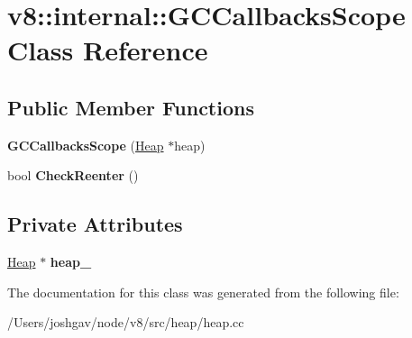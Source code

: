 \hypertarget{classv8_1_1internal_1_1_g_c_callbacks_scope}{}\section{v8\+:\+:internal\+:\+:G\+C\+Callbacks\+Scope Class Reference}
\label{classv8_1_1internal_1_1_g_c_callbacks_scope}
\subsection*{Public Member Functions}
\begin{DoxyCompactItemize}
\item 
{\bfseries G\+C\+Callbacks\+Scope} (\hyperlink{classv8_1_1internal_1_1_heap}{Heap} $\ast$heap)\hypertarget{classv8_1_1internal_1_1_g_c_callbacks_scope_a4e1f52e32b1e4858d57300a08d121068}{}\label{classv8_1_1internal_1_1_g_c_callbacks_scope_a4e1f52e32b1e4858d57300a08d121068}

\item 
bool {\bfseries Check\+Reenter} ()\hypertarget{classv8_1_1internal_1_1_g_c_callbacks_scope_acb4a1e89fea6942a7258066801521489}{}\label{classv8_1_1internal_1_1_g_c_callbacks_scope_acb4a1e89fea6942a7258066801521489}

\end{DoxyCompactItemize}
\subsection*{Private Attributes}
\begin{DoxyCompactItemize}
\item 
\hyperlink{classv8_1_1internal_1_1_heap}{Heap} $\ast$ {\bfseries heap\+\_\+}\hypertarget{classv8_1_1internal_1_1_g_c_callbacks_scope_a2b2f78049ca1fa7bcc356ef5d515afdc}{}\label{classv8_1_1internal_1_1_g_c_callbacks_scope_a2b2f78049ca1fa7bcc356ef5d515afdc}

\end{DoxyCompactItemize}


The documentation for this class was generated from the following file\+:\begin{DoxyCompactItemize}
\item 
/\+Users/joshgav/node/v8/src/heap/heap.\+cc\end{DoxyCompactItemize}
